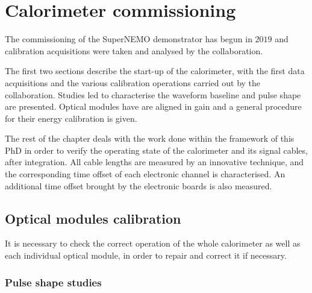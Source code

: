 \chapter{Calorimeter commissioning}
\label{ch:commissioning}

The commissioning of the SuperNEMO demonstrator has begun in $2019$ and calibration acquisitions were taken and analysed by the collaboration.

The first two sections describe the start-up of the calorimeter, with the first data acquisitions and the various calibration operations carried out by the collaboration.
Studies led to characterise the waveform baseline and pulse shape are presented.
Optical modules have are aligned in gain and a general procedure for their energy calibration is given.

The rest of the chapter deals with the work done within the framework of this PhD in order to verify the operating state of the calorimeter and its signal cables, after integration.
All cable lengths are measured by an innovative technique, and the corresponding time offset of each electronic channel is characterised.
An additional time offset brought by the electronic boards is also measured.

\section{Optical modules calibration}

It is necessary to check the correct operation of the whole calorimeter as well as each individual optical module, in order to repair and correct it if necessary.

\subsection{Pulse shape studies}
\label{subsec:SN_pulse_shape}

